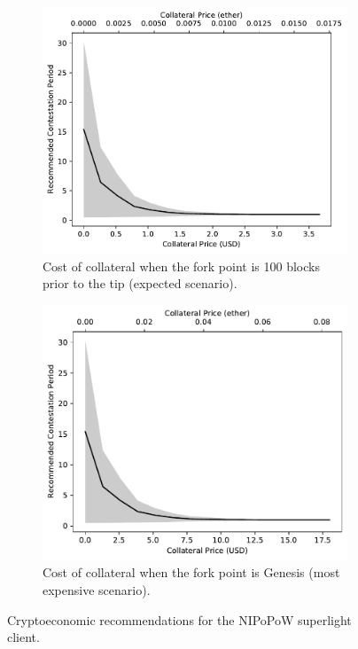 \begin{figure}
    \centering
    \begin{subfigure}{0.7\columnwidth}
        \centering
        \includegraphics[width=1.036\columnwidth]{figures/cryptoeconomics-collateral-100.pdf}
        \caption{Cost of collateral when the fork point is 100 blocks prior to the
        tip (expected scenario).}
        \label{fig:cryptoeconomics-collateral-100}
    \end{subfigure}
    \begin{subfigure}{0.7\columnwidth}
        \centering
        \includegraphics[width=1\columnwidth]{figures/cryptoeconomics-collateral-genesis.pdf}
        \caption{Cost of collateral when the fork point is Genesis (most expensive scenario).}
        \label{fig:cryptoeconomics-collateral-genesis}
    \end{subfigure}
    \caption{Cryptoeconomic recommendations for the NIPoPoW superlight client.}
    \label{fig:cryptoeconomics-collateral}
\end{figure}

